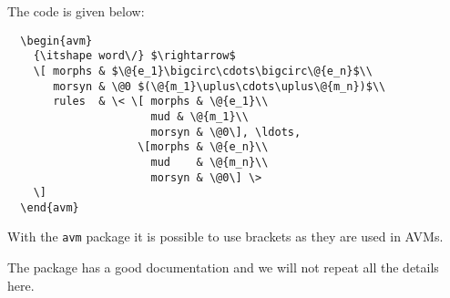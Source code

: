 The code is given below:
\begin{verbatim}
  \begin{avm}
    {\itshape word\/} $\rightarrow$
    \[ morphs & $\@{e_1}\bigcirc\cdots\bigcirc\@{e_n}$\\
       morsyn & \@0 $(\@{m_1}\uplus\cdots\uplus\@{m_n})$\\
       rules  & \< \[ morphs & \@{e_1}\\
                      mud & \@{m_1}\\ 
                      morsyn & \@0\], \ldots,
                    \[morphs & \@{e_n}\\
                      mud    & \@{m_n}\\ 
                      morsyn & \@0\] \>
    \]
  \end{avm}
\end{verbatim}
With the \texttt{avm} package it is possible to use brackets as they are used in AVMs.

The package has a good documentation and we will not repeat all the details here.






